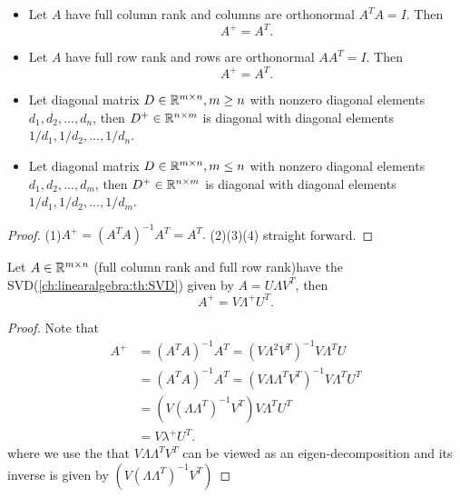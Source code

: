 \begin{refsection}
\begin{lemma}\hfill
\begin{itemize}
	\item Let $A$ have full column rank and columns are orthonormal $A^TA = I$. Then
	$$A^+ = A^T.$$
	\item Let $A$ have full row rank and rows are orthonormal $AA^T = I$. Then
	$$A^+ = A^T.$$
	\item Let diagonal matrix $D\in \mathbb{R}^{m\times n}, m \geq n$ with nonzero diagonal elements $d_1,d_2,...,d_n$, then
			 $D^+ \in \mathbb{R}^{n\times m}$ is diagonal with diagonal elements $1/d_1,1/d_2,...,1/d_n$.
	\item Let diagonal matrix $D\in \mathbb{R}^{m\times n}, m \leq n$ with nonzero diagonal elements $d_1,d_2,...,d_m$, then
	$D^+ \in \mathbb{R}^{n\times m}$ is diagonal with diagonal elements $1/d_1,1/d_2,...,1/d_m$.		 
\end{itemize}	
\end{lemma}
\begin{proof}
(1)$A^+ = (A^TA)^{-1}A^T = A^T.$ (2)(3)(4) straight forward.
	
\end{proof}


\begin{theorem}\label{ch:linearalgebra:th:SVDAndPseudoinverse}
Let $A \in \mathbb{R}^{m\times n}$ (full column rank and full row rank)have the SVD(\autoref{ch:linearalgebra:th:SVD}) given by $A = U\Lambda V^T$, then
$$A^+ = V\Lambda^+ U^T.$$	
\end{theorem}
\begin{proof}
Note that
\begin{align*}
A^+ &= (A^TA)^{-1}A^T = (V\Lambda^2 V^T)^{-1}   V\Lambda^T U\\
&= (A^TA)^{-1}A^T = (V\Lambda \Lambda^T V^T)^{-1}V\Lambda^T U^T \\
&= (V(\Lambda \Lambda^T)^{-1} V^T)V\Lambda^T U^T \\
&= V\lambda^+ U^T.
\end{align*}
where we use the that $V\Lambda \Lambda^T V^T$ can be viewed as an eigen-decomposition and its inverse is given by $(V(\Lambda \Lambda^T)^{-1} V^T)$
\end{proof}




\end{refsection}

